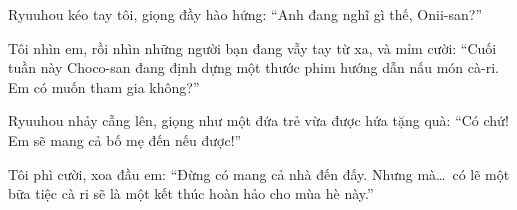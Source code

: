 \documentclass[../main.tex]{subfiles}
\begin{document}
Ryuuhou kéo tay tôi, giọng đầy hào hứng: ``Anh đang nghĩ gì thế, Onii-san?''

Tôi nhìn em, rồi nhìn những người bạn đang vẫy tay từ xa, và mỉm cười: ``Cuối tuần này Choco-san đang định dựng một thước phim hướng dẫn nấu món cà-ri. Em có muốn tham gia không?''

Ryuuhou nhảy cẫng lên, giọng như một đứa trẻ vừa được hứa tặng quà: ``Có chứ! Em sẽ mang cả bố mẹ đến nếu được!''

Tôi phì cười, xoa đầu em: ``Đừng có mang cả nhà đến đấy. Nhưng mà\dots\ có lẽ một bữa tiệc cà ri sẽ là một kết thúc hoàn hảo cho mùa hè này.''
\end{document}
